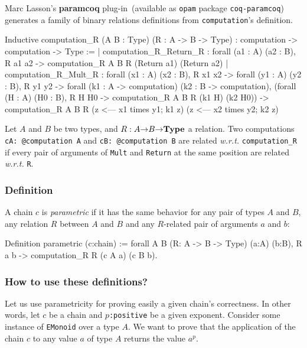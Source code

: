 
Marc Lasson's \textbf{paramcoq} plug-in~(available as  \texttt{opam} package 
\texttt{coq-paramcoq}) generates  a family of binary relations definitions
from \texttt{computation}'s definition.

\begin{Coqanswer}
Inductive
computation_R (A B : Type) (R : A -> B -> Type)
  : computation -> computation -> Type :=
 |    computation_R_Return_R : 
       forall (a1 : A) (a2 : B),  R a1 a2 ->
         computation_R A B R (Return a1) (Return a2)
  | computation_R_Mult_R : forall (x1 : A) (x2 : B),
         R x1 x2 ->
          forall (y1 : A) (y2 : B),
            R y1 y2 ->
            forall (k1 : A -> computation)
                   (k2 : B -> computation),
                      (forall (H : A) (H0 : B),
                          R H H0 -> 
                          computation_R A B R (k1 H) (k2 H0)) ->
                       computation_R A  B R 
                          (z <--- x1 times y1; k1 z)
                          (z <--- x2 times y2; k2 z)
\end{Coqanswer}


Let $A$ and $B$  be two types, and $R: A \mbox{$\rightarrow$} B \mbox{$\rightarrow$} \textbf{Type}$ 
a relation.
Two computations \texttt{cA: @computation A} and \texttt{cB: @computation B}
are related \emph{w.r.t.} \texttt{computation\_R} if every pair of 
arguments of \texttt{Mult} and \texttt{Return} at the same position 
are related \emph{w.r.t.} \texttt{R}.


\subsubsection{Definition}
A chain $c$ is \emph{parametric} if it has the same behavior for any
pair of types $A$  and $B$, any relation $R$
between  $A$ and $B$ and any $R$-related pair of 
arguments $a$ and $b$:

\begin{Coqsrc}
Definition parametric (c:chain) :=
  forall A B (R: A -> B -> Type) (a:A) (b:B),
   R a b -> computation_R  R (c A a) (c B b).
\end{Coqsrc}

\subsubsection{How to use these definitions?}
Let us use parametricity for proving easily 
a given chain's correctness.
In other words, 
let $c$ be a chain and \texttt{$p$:positive} be a given exponent.
Consider some instance of \texttt{EMonoid} over a type $A$.
We want to prove that the application of the chain $c$ to 
any value $a$ of type $A$ returns the value \texttt{$a^p$}.

